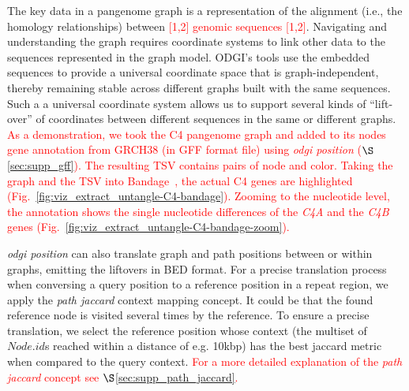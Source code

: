 \documentclass{bioinfo}
\newcommand{\REVIEWED}[1]{{\textcolor{Red}{#1}}}
\begin{document}
The key data in a pangenome graph is a representation of the alignment (i.e., the homology relationships) between \REVIEWED{[1,2] genomic sequences [1,2]}.
Navigating and understanding the graph requires coordinate systems to link other data to the sequences represented in the graph model.
ODGI's tools use the embedded sequences to provide a universal coordinate space that is graph-independent, thereby remaining stable across different graphs built with the same sequences.
Such a a universal coordinate system allows us to support several kinds of ``lift-over'' of coordinates between different sequences in the same or different graphs.
\REVIEWED{As a demonstration, we took the C4 pangenome graph and added to its nodes gene annotation from GRCH38 (in GFF format file) using \textit{odgi position} ($\S$\ref{sec:supp_gff}). The resulting TSV contains pairs of node and color. Taking the graph and the TSV into Bandage~\citep{Wick_2015}, the actual C4 genes are highlighted (Fig.~\ref{fig:viz_extract_untangle-C4-bandage}). Zooming to the nucleotide level, the annotation shows the single nucleotide differences of the \textit{C4A} and the \textit{C4B} genes (Fig.~\ref{fig:viz_extract_untangle-C4-bandage-zoom}).}

\textit{odgi position} can also translate graph and path positions between or within graphs, emitting the liftovers in BED format.
For a precise translation process when conversing a query position to a reference position in a repeat region, we apply the \textit{path jaccard} context mapping concept.
It could be that the found reference node is visited several times by the reference.
To ensure a precise translation, we select the reference position whose context (the multiset of $Node.id$s reached within a distance of e.g. 10kbp) has the best jaccard metric when compared to the query context. \REVIEWED{For a more detailed explanation of the \textit{path jaccard} concept see $\S$\ref{sec:supp_path_jaccard}.}

\end{document}

